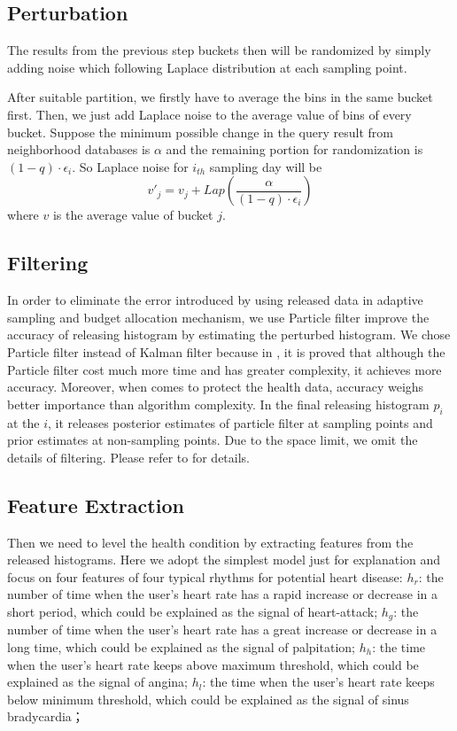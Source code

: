 \documentclass[10pt,conference]{IEEEtran}
\begin{document}
\subsection{Perturbation}
The results from the previous step buckets then will be randomized by simply adding noise which following Laplace distribution at each sampling point.

After suitable partition, we firstly have to average the bins in the same bucket first. Then, we just add Laplace noise to the average value of bins of every bucket. Suppose the minimum possible change in the query result from neighborhood databases is $\alpha$ and the remaining portion for randomization is $(1-q)\cdot \epsilon_i$. So Laplace noise for $i_{th}$ sampling day will be
\begin{equation}\label{key}
v'_j=v_j+Lap(\frac{\alpha}{(1-q)\cdot \epsilon_i})
\end{equation}
where $v$ is the average value of bucket $j$.

\subsection{Filtering}
In order to eliminate the error introduced by using released data in adaptive sampling and budget allocation mechanism, we use Particle filter improve the accuracy of releasing histogram by estimating the perturbed histogram. We chose Particle filter instead of Kalman filter because in \cite{fan2014adaptive}, it is proved that although the Particle filter cost much more time and has greater complexity, it achieves more accuracy. Moreover, when comes to protect the health data, accuracy weighs better importance than algorithm complexity. In the final releasing histogram $p_i$ at the $i$, it releases posterior estimates of particle filter at sampling points and prior estimates at non-sampling points. Due to the space limit, we omit the details of filtering. Please refer to\cite{fan2014adaptive} for details.

\subsection{Feature Extraction}
Then we need to level the health condition by extracting features from the released histograms. Here we adopt the simplest model just for explanation and focus on four features of four typical rhythms for potential heart disease:
$h_r$: the number of time when the user's heart rate has a rapid increase or decrease in a short period, which could be explained as the signal of heart-attack;
$h_g$: the number of time when the user's heart rate has a great increase or decrease in a long time, which could be explained as the signal of palpitation;
$h_h$: the time when the user's heart rate keeps above maximum threshold, which could be explained as the signal of angina;
$h_l$: the time when the user's heart rate keeps below minimum threshold, which could be explained as the signal of sinus bradycardia；
\end{document}
